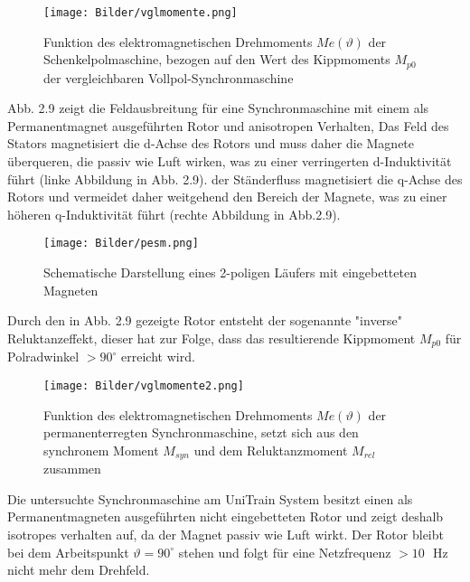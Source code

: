  
 \begin{figure}[H]
 	\centering
 	\texttt{[image: Bilder/vglmomente.png]} %
 	\caption{Funktion des elektromagnetischen Drehmoments $Me(\vartheta)$
der Schenkelpolmaschine,
bezogen auf den Wert des
Kippmoments $M_{p0}$ der
vergleichbaren
Vollpol-Synchronmaschine \cite{binder}\\}
 	\label{fig: Vergleich der wirkenden Drehmomente }
 \end{figure}
 
 
Abb. 2.9 zeigt die Feldausbreitung für eine Synchronmaschine mit einem als Permanentmagnet ausgeführten Rotor und anisotropen Verhalten,
Das Feld des Stators magnetisiert die d-Achse des Rotors und muss daher die Magnete überqueren, die passiv wie Luft wirken, was zu einer verringerten d-Induktivität führt (linke Abbildung in Abb. 2.9). der Ständerfluss magnetisiert die q-Achse des Rotors und vermeidet daher weitgehend den Bereich der Magnete, was zu einer höheren q-Induktivität führt (rechte Abbildung in Abb.2.9).\cite{binder}

   
   \begin{figure}[H]
 	\centering
 	\texttt{[image: Bilder/pesm.png]} %
 	\caption{Schematische Darstellung eines 2-poligen Läufers mit eingebetteten Magneten \cite{binder}\\}
 	\label{fig: Vergrabene Magnete }
 \end{figure}
 
 Durch den in Abb. 2.9 gezeigte Rotor entsteht der sogenannte "inverse" Reluktanzeffekt, dieser hat zur Folge, dass das resultierende Kippmoment $M_{p0}$ für Polradwinkel $> 90^{\circ}$ erreicht wird.
 
  \begin{figure}[H]
 	\centering
 	\texttt{[image: Bilder/vglmomente2.png]} %
 	\caption{Funktion des elektromagnetischen Drehmoments $Me(\vartheta)$
 		der permanenterregten Synchronmaschine, setzt sich aus den synchronem Moment $M_{syn}$ und dem Reluktanzmoment $M_{rel}$ zusammen \cite{binder}\\}
 	\label{fig: Vergleich der wirkenden Drehmomente2 }
 \end{figure}
 
 
  Die untersuchte Synchronmaschine am UniTrain System besitzt einen als Permanentmagneten ausgeführten nicht eingebetteten Rotor und zeigt deshalb isotropes verhalten auf, da der Magnet passiv wie Luft wirkt. Der Rotor bleibt bei dem Arbeitspunkt $\vartheta = 90^\circ$ stehen und folgt für eine Netzfrequenz $>10\text{ }\si{\hertz}$ nicht mehr dem Drehfeld. 


